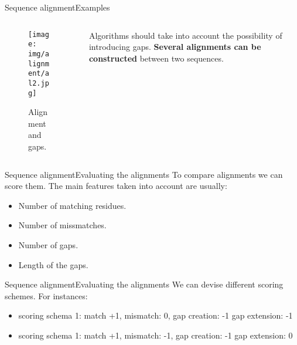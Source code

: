 \documentclass[10pt]{beamer}
\newcommand{\1}{
	\setbeamertemplate{background}{
		\texttt{[image: img/1]}
		\tikz[overlay] \fill[fill opacity=0.75,fill=white] (0,0) rectangle (-\paperwidth,\paperheight);
	}
}
\begin{document}
\begin{frame}{Sequence alignment}{Examples}
\begin{columns}
	\begin{column}{0.48\textwidth}
		\begin{figure}[]
			\centering
			\texttt{[image: img/alignment/al2.jpg]}
			\label{img:alig}
			\caption{Alignment and gaps.}
		\end{figure}
	\end{column}
	\begin{column}{0.48\textwidth}
		Algorithms should take into account the possibility of introducing gaps. \textbf{Several alignments can be constructed} between two sequences.
	\end{column}
\end{columns}
	
\end{frame}

\begin{frame}{Sequence alignment}{Evaluating the alignments}
To compare alignments we can score them. The main features taken into account are usually: 
\begin{itemize}
	\item Number of matching residues.
	\item Number of missmatches.
	\item Number of gaps.
	\item Length of the gaps.
\end{itemize}
\end{frame}

\begin{frame}{Sequence alignment}{Evaluating the alignments}
	We can devise different scoring schemes. For instances:
	\begin{itemize}
		\item scoring schema 1: match +1, mismatch: 0, gap creation: -1 gap extension: -1
		\item scoring schema 1: match +1, mismatch: -1, gap creation: -1 gap extension: 0
	\end{itemize}
\end{frame}
\end{document}
